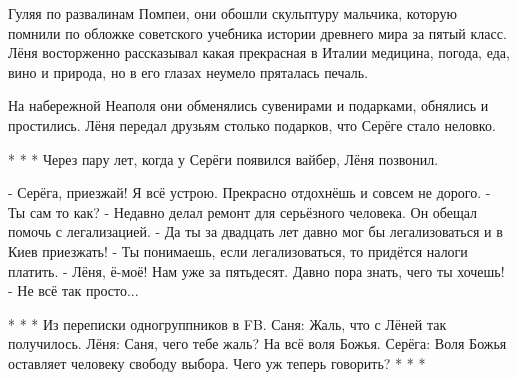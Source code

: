 Гуляя по развалинам Помпеи, они обошли скульптуру мальчика, которую помнили по
обложке советского учебника истории древнего мира за пятый класс. Лёня
восторженно рассказывал какая прекрасная в Италии медицина, погода, еда, вино и
природа, но в его глазах неумело пряталась печаль.

На набережной Неаполя они обменялись сувенирами и подарками, обнялись и
простились. Лёня передал друзьям столько подарков, что Серёге стало неловко.

* * *
Через пару лет, когда у Серёги появился вайбер, Лёня позвонил.

\obeycr
- Серёга, приезжай! Я всё устрою. Прекрасно отдохнёшь и совсем не дорого.
- Ты сам то как?
- Недавно делал ремонт для серьёзного человека. Он обещал помочь с легализацией.
- Да ты за двадцать лет давно мог бы легализоваться и в Киев приезжать!
- Ты понимаешь, если легализоваться, то придётся налоги платить.
- Лёня, ё-моё!  Нам уже за пятьдесят. Давно пора знать, чего ты хочешь!
- Не всё так просто...
\restorecr

* * *
Из переписки одногруппников в FB.
Саня: Жаль, что с Лёней так получилось.
Лёня: Саня, чего тебе жаль? На всё воля Божья.
Серёга: Воля Божья оставляет человеку свободу выбора. Чего уж теперь говорить?
* * *
